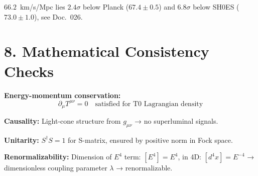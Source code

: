 	\begin{table}[h!]
		\centering
		\caption{Empirical predictions of T0 theory (all without free parameters!)}
	\end{table}
	$66.2$~km/s/Mpc lies $2.4\sigma$ below Planck ($67.4\pm0.5$) and $6.8\sigma$ below SH0ES ($73.0\pm1.0$), see Doc.~026.
	
	\section*{8. Mathematical Consistency Checks}
	
	\textbf{Energy-momentum conservation:}
	\[
	\partial_\mu T^{\mu\nu} = 0 \quad \text{satisfied for T0 Lagrangian density}
	\]
	
	\textbf{Causality:} Light-cone structure from $g_{\mu\nu}$ → no superluminal signals.
	
	\textbf{Unitarity:} $S^\dagger S = 1$ for S-matrix, ensured by positive norm in Fock space.
	
	\textbf{Renormalizability:} Dimension of $E^4$ term: $[E^4] = E^4$, in 4D: $[d^4x] = E^{-4}$ → dimensionless coupling parameter $\lambda$ → renormalizable.
	